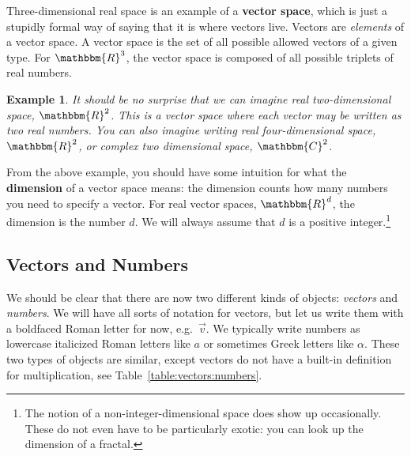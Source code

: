 \documentclass[12pt]{article}
\newtheorem{example}{Example}[section]
\begin{document}
Three-dimensional real space is an example of a \textbf{vector space}, which is just a stupidly formal way of saying that it is where vectors live. Vectors are \emph{elements} of a vector space. A vector space is the set of all possible allowed vectors of a given type. For $\mathbbm{R}^3$, the vector space is composed of all possible triplets of real numbers. 


\begin{example} It should be no surprise that we can imagine real two-dimensional space, $\mathbbm{R}^2$. This is a vector space where each vector may be written as two real numbers. You can also imagine writing real four-dimensional space, $\mathbbm{R}^2$, or complex two dimensional space, $\mathbbm{C}^2$. 
\end{example}

From the above example, you should have some intuition for what the \textbf{dimension} of a vector space means: the dimension counts how many numbers you need to specify a vector. For real vector spaces, $\mathbbm{R}^d$, the dimension is the number $d$. We will always assume that $d$ is a positive integer.\footnote{The notion of a non-integer-dimensional space does show up occasionally. These do not even have to be particularly exotic: you can look up the dimension of a fractal.}

\subsection{Vectors and Numbers}


We should be clear that there are now two different kinds of objects: \emph{vectors} and \emph{numbers}. We will have all sorts of notation for vectors, but let us write them with a boldfaced Roman letter for now, e.g.~$\vec{v}$. We typically write numbers as lowercase italicized Roman letters like $a$ or sometimes Greek letters like $\alpha$. These two types of objects are similar, except vectors do not have a built-in definition for multiplication, see Table~\ref{table:vectors:numbers}.
\end{document}
